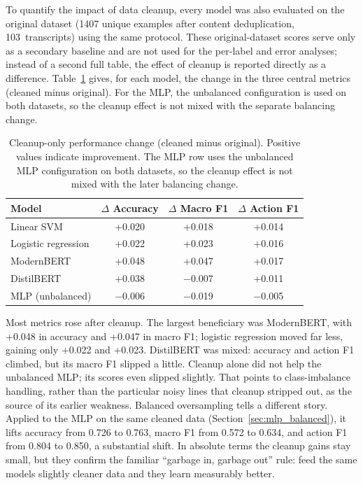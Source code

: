 To quantify the impact of data cleanup, every model was also evaluated on the original dataset (1407 unique examples after content deduplication, 103~transcripts) using the same protocol. These original-dataset scores serve only as a secondary baseline and are not used for the per-label and error analyses; instead of a second full table, the effect of cleanup is reported directly as a difference. Table~\ref{tab:cleanup_delta} gives, for each model, the change in the three central metrics (cleaned minus original). For the MLP, the unbalanced configuration is used on both datasets, so the cleanup effect is not mixed with the separate balancing change.

\begin{table}[H]
\centering
\caption{Cleanup-only performance change (cleaned minus original). Positive values indicate improvement. The MLP row uses the unbalanced MLP configuration on both datasets, so the cleanup effect is not mixed with the later balancing change.}
\label{tab:cleanup_delta}
\begin{tabular}{@{}lccc@{}}
\toprule
\textbf{Model} & \textbf{$\Delta$ Accuracy} & \textbf{$\Delta$ Macro F1} & \textbf{$\Delta$ Action F1} \\
\midrule
Linear SVM          & +0.020 & +0.018 & +0.014 \\
Logistic regression & +0.022 & +0.023 & +0.016 \\
ModernBERT          & +0.048 & +0.047 & +0.017 \\
DistilBERT          & +0.038 & $-$0.007 & +0.011 \\
MLP (unbalanced)    & $-$0.006 & $-$0.019 & $-$0.005 \\
\bottomrule
\end{tabular}
\end{table}

Most metrics rose after cleanup. The largest beneficiary was ModernBERT, with +0.048 in accuracy and +0.047 in macro F1; logistic regression moved far less, gaining only +0.022 and +0.023. DistilBERT was mixed: accuracy and action F1 climbed, but its macro F1 slipped a little. Cleanup alone did not help the unbalanced MLP; its scores even slipped slightly. That points to class-imbalance handling, rather than the particular noisy lines that cleanup stripped out, as the source of its earlier weakness. Balanced oversampling tells a different story. Applied to the MLP on the same cleaned data (Section~\ref{sec:mlp_balanced}), it lifts accuracy from 0.726 to 0.763, macro F1 from 0.572 to 0.634, and action F1 from 0.804 to 0.850, a substantial shift. In absolute terms the cleanup gains stay small, but they confirm the familiar ``garbage in, garbage out'' rule: feed the same models slightly cleaner data and they learn measurably better.

